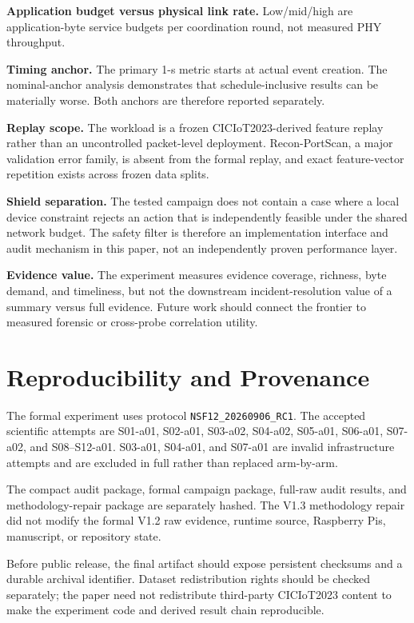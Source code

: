 \documentclass[10pt,journal]{IEEEtran}
\begin{document}
\textbf{Application budget versus physical link rate.}
Low/mid/high are application-byte service budgets per coordination
round, not measured PHY throughput.

\textbf{Timing anchor.}
The primary 1-s metric starts at actual event creation. The nominal-anchor
analysis demonstrates that schedule-inclusive results can be materially
worse. Both anchors are therefore reported separately.

\textbf{Replay scope.}
The workload is a frozen CICIoT2023-derived feature replay rather than an
uncontrolled packet-level deployment. Recon-PortScan, a major validation
error family, is absent from the formal replay, and exact feature-vector
repetition exists across frozen data splits.

\textbf{Shield separation.}
The tested campaign does not contain a case where a local device
constraint rejects an action that is independently feasible under the
shared network budget. The safety filter is therefore an implementation
interface and audit mechanism in this paper, not an independently proven
performance layer.

\textbf{Evidence value.}
The experiment measures evidence coverage, richness, byte demand, and
timeliness, but not the downstream incident-resolution value of a
summary versus full evidence. Future work should connect the frontier to
measured forensic or cross-probe correlation utility.

\section{Reproducibility and Provenance}
\label{sec:reproducibility}

The formal experiment uses protocol
\texttt{NSF12\_20260906\_RC1}.
The accepted scientific attempts are S01-a01, S02-a01, S03-a02,
S04-a02, S05-a01, S06-a01, S07-a02, and S08--S12-a01.
S03-a01, S04-a01, and S07-a01 are invalid infrastructure attempts and
are excluded in full rather than replaced arm-by-arm.

The compact audit package, formal campaign package, full-raw audit
results, and methodology-repair package are separately hashed.
The V1.3 methodology repair did not modify the formal V1.2 raw evidence,
runtime source, Raspberry Pis, manuscript, or repository state.

Before public release, the final artifact should expose persistent
checksums and a durable archival identifier. Dataset redistribution
rights should be checked separately; the paper need not redistribute
third-party CICIoT2023 content to make the experiment code and derived
result chain reproducible.
\end{document}
